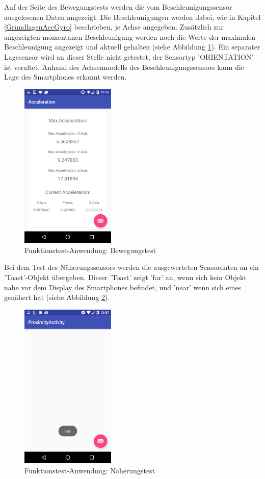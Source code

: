 Auf der Seite des Bewegungstests werden die vom Beschleunigungssensor ausgelesenen Daten angezeigt. Die Beschleunigungen werden dabei, wie in Kapitel \ref{GrundlagenAccGyro} beschrieben, je Achse angegeben. Zusätzlich zur angezeigten momentanen Beschleunigung werden noch die Werte der maximalen Beschleunigung angezeigt und aktuell gehalten (siehe Abbildung \ref{fig:Accelerometer}). Ein separater Lagesensor wird an dieser Stelle nicht getestet, der Sensortyp 'ORIENTATION' ist veraltet. Anhand des Achsenmodells des Beschleunigungssensors kann die Lage des Smartphones erkannt werden. 
\clearpage

\begin{figure}[h]
	\centering
	\includegraphics[width=0.4\textwidth]{Bilder/Screenshots/Screenshot_20170214-235635.PNG}
	\caption{Funktionstest-Anwendung: Bewegungstest}
	\label{fig:Accelerometer}
\end{figure}

Bei dem Test des Näherungssensors werden die ausgewerteten Sensordaten an ein 'Toast'-Objekt übergeben. Dieser 'Toast' zeigt 'far' an, wenn sich kein Objekt nahe vor dem Display des Smartphones befindet, und 'near' wenn sich eines genähert hat (siehe Abbildung \ref{fig:Proximity}).

 \clearpage

\begin{figure}[h]
	\centering
	\includegraphics[width=0.4\textwidth]{Bilder/Screenshots/Screenshot_20170214-235744.PNG}
	\caption{Funktionstest-Anwendung: Näherungstest}
	\label{fig:Proximity}
\end{figure}
